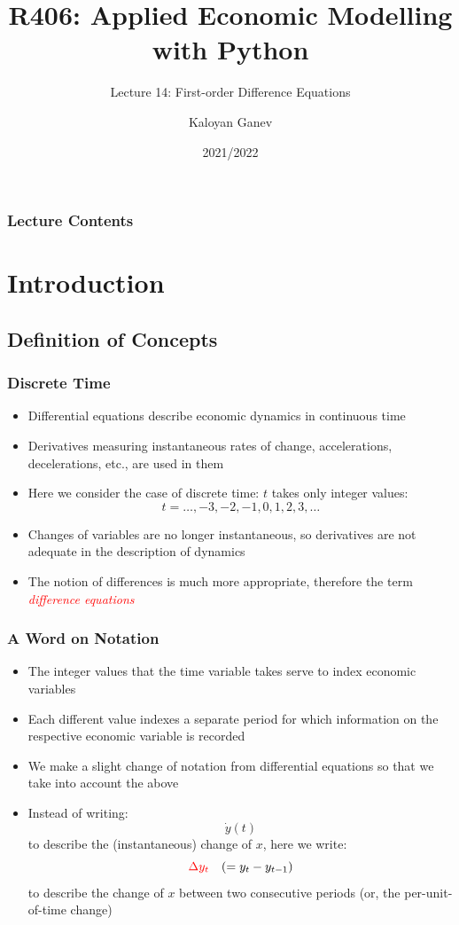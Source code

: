 \documentclass[10pt,usenames,dvipsnames]{beamer}
\title{R406: Applied Economic Modelling with Python}
\subtitle{Lecture 14: \textcolor{myred}{First-order Difference Equations}}
\author{Kaloyan Ganev}
\date{2021/2022}
\theoremstyle{definition}
\begin{document}
\maketitle

\begin{frame}[fragile]
\frametitle{Lecture Contents}
\tableofcontents
\end{frame}

\section{Introduction}
\subsection{Definition of Concepts}
\begin{frame}[fragile]
\frametitle{Discrete Time}
\begin{itemize}
	\item Differential equations describe economic dynamics in continuous time
	\item Derivatives measuring instantaneous rates of change, accelerations, decelerations, etc., are used in them
	\item Here we consider the case of discrete time: $t$ takes only integer values:
	\[
		t = \ldots, -3, -2, -1, 0, 1, 2, 3,\ldots
	\]
	\item Changes of variables are no longer instantaneous, so derivatives are not adequate in the description of dynamics
	\item The notion of differences is much more appropriate, therefore the term \textcolor{red}{\emph{difference equations}}
\end{itemize}
\end{frame}

\begin{frame}[fragile]
\frametitle{A Word on Notation}
\begin{itemize}
	\item The integer values that the time variable takes serve to index economic variables 
	\item Each different value indexes a separate period for which information on the respective economic variable is recorded
	\item We make a slight change of notation from differential equations so that we take into account the above
	\item Instead of writing:
	\[
		\dot{y}(t)
	\]
	to describe the (instantaneous) change of $x$, here we write:
	\[
		\textcolor{red}{\Delta y_{t}}\quad ( = y_{t} - y_{t-1})
	\]
	to describe the change of $x$ between two consecutive periods (or, the per-unit-of-time change)
\end{itemize}
\end{frame}
\end{document}
